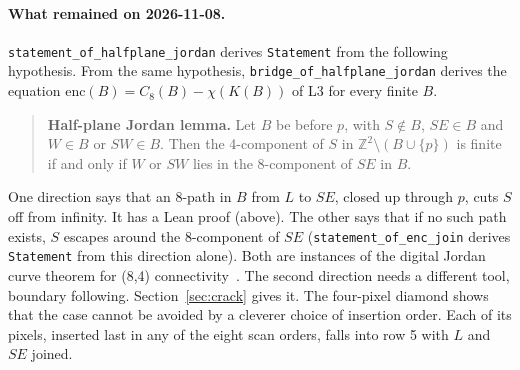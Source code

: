 \documentclass[11pt]{article}
\theoremstyle{definition}
\theoremstyle{remark}
\begin{document}
\paragraph{What remained on 2026-11-08.} \texttt{statement\_of\_halfplane\_jordan} derives
\texttt{Statement} from the following hypothesis. From the
same hypothesis, \texttt{bridge\_of\_halfplane\_jordan} derives the equation
$\mathrm{enc}(B)=C_8(B)-\chi(K(B))$ of L3 for every finite $B$.

\begin{quote}
\textbf{Half-plane Jordan lemma.} Let $B$ be before $p$, with
$S\notin B$, $SE\in B$ and $W\in B$ or $SW\in B$. Then the 4-component of $S$ in
$\mathbb{Z}^2\setminus(B\cup\{p\})$ is finite if and only if $W$ or $SW$ lies in the
8-component of $SE$ in $B$.
\end{quote}

One direction says that an 8-path in $B$ from $L$ to $SE$, closed up through $p$,
cuts $S$ off from infinity. It has a Lean proof (above). The other says that if no
such path exists, $S$ escapes around the 8-component of $SE$
(\texttt{statement\_of\_enc\_join} derives \texttt{Statement} from this direction
alone). Both are instances of the digital Jordan curve theorem for (8,4)
connectivity~\cite{Rosenfeld1970,KongRosenfeld1989}. The second direction needs
a different tool, boundary following. Section~\ref{sec:crack} gives it. The
four-pixel diamond shows that the case cannot be avoided by a cleverer choice of
insertion order. Each of its pixels, inserted last in any of the eight scan
orders, falls into row 5 with $L$ and $SE$ joined.
\end{document}
